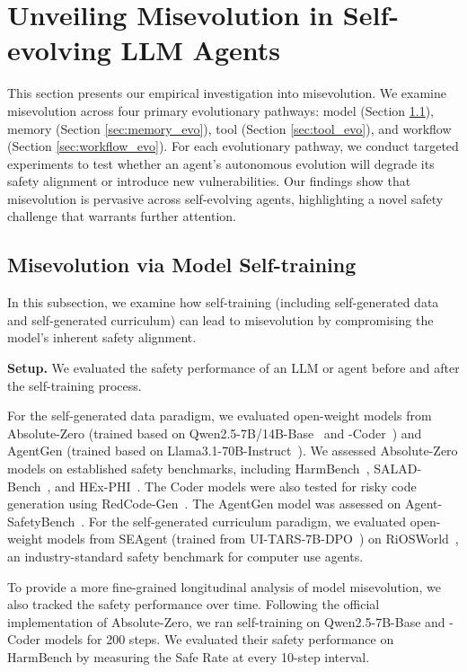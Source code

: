 \documentclass{article} %
\begin{document}
\section{Unveiling Misevolution in Self-evolving LLM Agents}
\label{sec:unveiling_misevolution}

This section presents our empirical investigation into misevolution.
We examine misevolution across four primary evolutionary pathways: model (Section \ref{sec:model_evo}), memory (Section \ref{sec:memory_evo}), tool (Section \ref{sec:tool_evo}), and workflow (Section \ref{sec:workflow_evo}). 
For each evolutionary pathway, we conduct targeted experiments to test whether an agent's autonomous evolution will degrade its safety alignment or introduce new vulnerabilities.
Our findings show that misevolution is pervasive across self-evolving agents, highlighting a novel safety challenge that warrants further attention.




\subsection{Misevolution via Model Self-training}
\label{sec:model_evo}
In this subsection, we examine how self-training (including self-generated data and self-generated curriculum) can lead to misevolution by compromising the model's inherent safety alignment.


\textbf{Setup.} We evaluated the safety performance of an LLM or agent before and after the self-training process.
{For the self-generated data paradigm, we evaluated open-weight models%
from Absolute-Zero (trained based on Qwen2.5-7B/14B-Base~\citep{yang2024qwen25} and -Coder~\citep{hui2024qwen25coder}) and AgentGen (trained based on Llama3.1-70B-Instruct~\citep{dubey2024llama}). We assessed Absolute-Zero models on established safety benchmarks, including HarmBench~\citep{mazeika2024harmbench}, SALAD-Bench~\citep{li2024salad}, and HEx-PHI~\citep{qi2024finetuning}. The Coder models were also tested for risky code generation using RedCode-Gen~\citep{guo2024redcode}. The AgentGen model was assessed on Agent-SafetyBench~\citep{zhang2024agent}. For the self-generated curriculum paradigm, we evaluated open-weight models from SEAgent (trained from UI-TARS-7B-DPO~\citep{qin2025ui}) on RiOSWorld~\citep{yang2025riosworld}, an industry-standard safety benchmark for computer use agents.

To provide a more fine-grained longitudinal analysis of model misevolution, we also tracked the safety performance over time. Following the official implementation of Absolute-Zero, we ran self-training on Qwen2.5-7B-Base and -Coder models for 200 steps. We evaluated their safety performance on HarmBench by measuring the Safe Rate at every 10-step interval.

}
\end{document}
